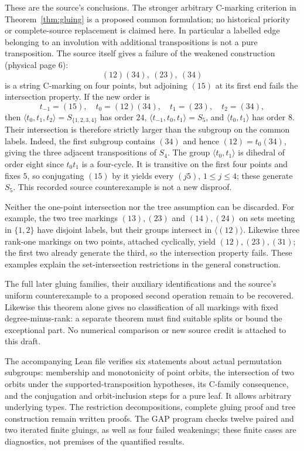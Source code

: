 \documentclass[a4paper,11pt]{article}
\newcommand{\gen}[1]{\langle #1\rangle}
\begin{document}
These are the source's conclusions. The stronger arbitrary C-marking
criterion in Theorem~\ref{thm:gluing} is a proposed common formulation;
no historical priority or complete-source replacement is claimed here.
In particular a labelled edge belonging to an involution with additional
transpositions is not a pure transposition. The source itself gives a failure
of the weakened construction (physical page 6):
\[
 (12)(34),\ (23),\ (34)
\]
is a string C-marking on four points, but adjoining $(15)$ at its first
end fails the intersection property. If the new order is
\[
 t_{-1}=(15),\quad t_0=(12)(34),\quad t_1=(23),\quad t_2=(34),
\]
then $\gen{t_0,t_1,t_2}=S_{\{1,2,3,4\}}$ has order $24$,
$\gen{t_{-1},t_0,t_1}=S_5$, and
$\gen{t_0,t_1}$ has order $8$. Their intersection is therefore strictly
larger than the subgroup on the common labels. Indeed, the first subgroup
contains $(34)$ and hence $(12)=t_0(34)$, giving the three adjacent
transpositions of $S_4$. The group $\langle t_0,t_1\rangle$ is dihedral of
order eight since $t_0t_1$ is a four-cycle. It is transitive on the first four
points and fixes $5$, so conjugating $(15)$ by it yields every $(j5)$,
$1\leq j\leq4$; these generate $S_5$. This recorded source
counterexample is not a new disproof.

Neither the one-point intersection nor the tree assumption can be discarded.
For example, the two tree markings $(13),(23)$ and $(14),(24)$ on sets
meeting in $\{1,2\}$ have disjoint labels, but their groups intersect in
$\langle(12)\rangle$. Likewise three rank-one markings on two points,
attached cyclically, yield $(12),(23),(31)$; the first two already generate
the third, so the intersection property fails. These examples explain the
set-intersection restrictions in the general construction.

The full later gluing families, their auxiliary identifications and the
source's uniform counterexample to a proposed second operation remain to be
recovered. Likewise this theorem alone gives no classification of all markings
with fixed degree-minus-rank: a separate theorem must find suitable splits
or bound the exceptional part. No numerical comparison or new source credit
is attached to this draft.

The accompanying Lean file verifies six statements about actual permutation
subgroups: membership and monotonicity of point orbits, the intersection of
two orbits under the supported-transposition hypotheses, its C-family
consequence, and the conjugation and orbit-inclusion steps for a pure leaf.
It allows arbitrary underlying types. The restriction decompositions,
complete gluing proof and tree construction remain written proofs. The
GAP program checks twelve paired and two iterated finite gluings, as well as
four failed weakenings; these
finite cases are diagnostics, not premises of the quantified results.
\end{document}

